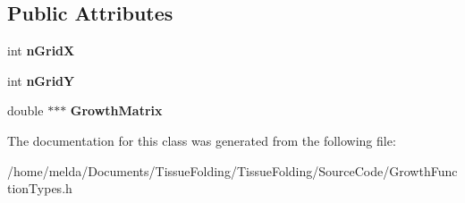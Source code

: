 \subsection*{Public Attributes}
\begin{DoxyCompactItemize}
\item 
\hypertarget{classGridBasedGrowthFunction_af872b9963f3a579dcd615c23bcb58a86}{}int {\bfseries n\+Grid\+X}\label{classGridBasedGrowthFunction_af872b9963f3a579dcd615c23bcb58a86}

\item 
\hypertarget{classGridBasedGrowthFunction_a625bc963a1f1e7d1f1a35dbd0ef51728}{}int {\bfseries n\+Grid\+Y}\label{classGridBasedGrowthFunction_a625bc963a1f1e7d1f1a35dbd0ef51728}

\item 
\hypertarget{classGridBasedGrowthFunction_a5522d9b84fa95ebd65cdf290a4f0a65c}{}double $\ast$$\ast$$\ast$ {\bfseries Growth\+Matrix}\label{classGridBasedGrowthFunction_a5522d9b84fa95ebd65cdf290a4f0a65c}

\end{DoxyCompactItemize}


The documentation for this class was generated from the following file\+:\begin{DoxyCompactItemize}
\item 
/home/melda/\+Documents/\+Tissue\+Folding/\+Tissue\+Folding/\+Source\+Code/Growth\+Function\+Types.\+h\end{DoxyCompactItemize}
